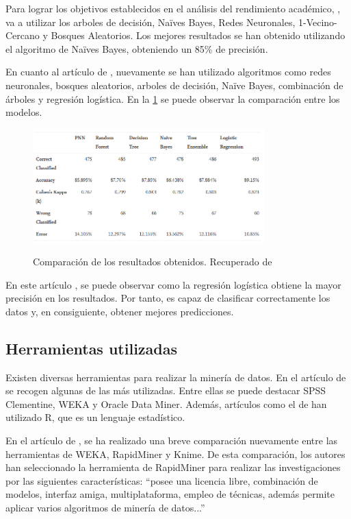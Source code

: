 Para lograr los objetivos establecidos en el análisis del rendimiento académico, , va a utilizar los arboles de decisión, Naïves Bayes, Redes Neuronales, 1-Vecino-Cercano y Bosques Aleatorios. Los mejores resultados se han obtenido utilizando el algoritmo de Naïves Bayes, obteniendo un 85\% de precisión.

En cuanto al artículo de , nuevamente se han utilizado algoritmos como redes neuronales, bosques aleatorios, arboles de decisión, Naïve Bayes, combinación de árboles y regresión logística. En la \ref{fig:compResMod} se puede observar la comparación entre los modelos.

\begin{figure}[htb]
	\centering
	\caption{Comparación de los resultados obtenidos. Recuperado de \protect{}}
	\includegraphics[width=0.8\textwidth]{recursos/ComparacionModelos}
	\label{fig:compResMod}
\end{figure}

En este artículo \cite{ADEKITAN2019e01250}, se puede observar como la regresión logística obtiene la mayor precisión en los resultados. Por tanto, es capaz de clasificar correctamente los datos y, en consiguiente, obtener mejores predicciones.



\subsection{Herramientas utilizadas}
Existen diversas herramientas para realizar la minería de datos. En el artículo de \cite{rodriguez2009herramientas} se recogen algunas de las más utilizadas. Entre ellas se puede destacar SPSS Clementine, WEKA y Oracle Data Miner. Además, artículos como el de \cite{jose2016explotacion} han utilizado R, que es un lenguaje estadístico.

En el artículo de , se ha realizado una breve comparación nuevamente entre las herramientas de WEKA, RapidMiner y Knime. De esta comparación, los autores han seleccionado la herramienta de RapidMiner para realizar las investigaciones por las siguientes características: ``posee una licencia libre, combinación de modelos, interfaz amiga, multiplataforma, empleo de técnicas, además permite aplicar varios algoritmos de minería de datos...'' \cite{jaramillo2015aplicacion}

